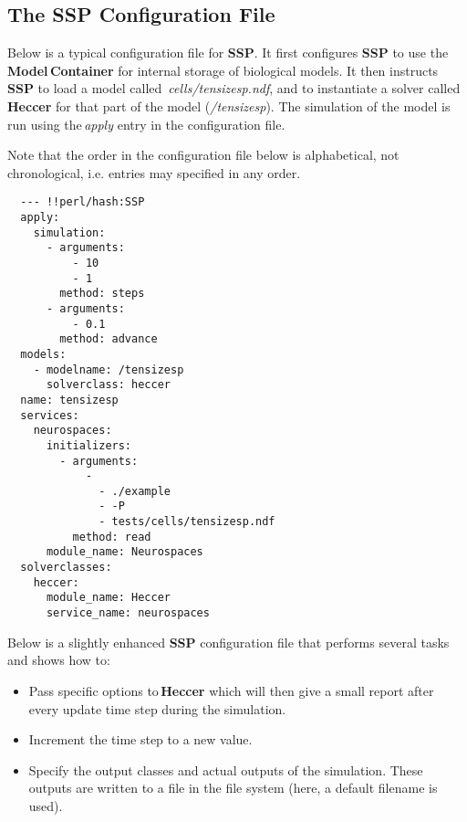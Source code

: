 \documentclass[12pt]{article}
\begin{document}
\subsection*{The SSP Configuration File}

Below is a typical configuration file for {\bf SSP}. It first configures {\bf SSP} to use the\,{\bf Model\,Container} for internal storage of biological models. It then instructs {\bf SSP} to load a model called \,{\it cells/tensizesp.ndf}, and to instantiate a solver called\,{\bf Heccer} for that part of the model ({\it /tensizesp}). The simulation of the model is run using the\,{\it apply} entry in the configuration file.

Note that the order in the configuration file below is alphabetical, not chronological, i.e. entries may specified in any order.

\begin{verbatim}
  --- !!perl/hash:SSP
  apply:
    simulation:
      - arguments:
          - 10
          - 1
        method: steps
      - arguments:
          - 0.1
        method: advance
  models:
    - modelname: /tensizesp
      solverclass: heccer
  name: tensizesp
  services:
    neurospaces:
      initializers:
        - arguments:
            -
              - ./example
              - -P
              - tests/cells/tensizesp.ndf
          method: read
      module_name: Neurospaces
  solverclasses:
    heccer:
      module_name: Heccer
      service_name: neurospaces
\end{verbatim}

Below is a slightly enhanced {\bf SSP} configuration file that performs several tasks and shows how to:

\begin{itemize}
\item Pass specific options to\,{\bf Heccer} which will then give a small report after every update time step during the simulation.
\item Increment the time step to a new value. 
\item Specify the output classes and actual outputs of the simulation. These outputs are written to a file in the file system (here, a default filename is used).
\end{itemize}
\end{document}

